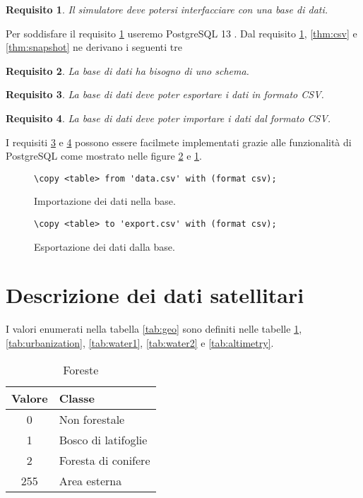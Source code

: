 \documentclass[draft]{article}
\newtheorem{requirement}{Requisito}
\begin{document}
\begin{requirement}\label{thm:db}
Il simulatore deve potersi interfacciare con una base di dati.
\end{requirement}

Per soddisfare il requisito \ref{thm:db} useremo PostgreSQL 13 \cite{psql}. Dal
requisito \ref{thm:db}, \ref{thm:csv} e \ref{thm:snapshot} ne derivano i
seguenti tre

\begin{requirement}
La base di dati ha bisogno di uno schema.
\end{requirement}

\begin{requirement}\label{thm:export}
La base di dati deve poter esportare i dati in formato CSV.
\end{requirement}

\begin{requirement}\label{thm:import}
La base di dati deve poter importare i dati dal formato CSV.
\end{requirement}

I requisiti \ref{thm:export} e \ref{thm:import} possono essere facilmete
implementati grazie alle funzionalità di PostgreSQL come mostrato nelle figure
\ref{fig:export} e \ref{fig:import}.

\begin{figure}
\centering\verb+\copy <table> from 'data.csv' with (format csv);+
\caption{Importazione dei dati nella base.}
\label{fig:import}
\end{figure}

\begin{figure}
\centering\verb+\copy <table> to 'export.csv' with (format csv);+
\caption{Esportazione dei dati dalla base.}
\label{fig:export}
\end{figure}

\appendix

\section{Descrizione dei dati satellitari}\label{sec:desc}

I valori enumerati nella tabella \ref{tab:geo} sono definiti nelle tabelle
\ref{tab:forest}, \ref{tab:urbanization}, \ref{tab:water1}, \ref{tab:water2} e
\ref{tab:altimetry}.

\begin{table}
\centering
\begin{tabular}{|c|l|}
\hline
\textbf{Valore} & \textbf{Classe}\\
\hline
0 & Non forestale\\
1 & Bosco di latifoglie\\
2 & Foresta di conifere\\
255 & Area esterna\\
\hline
\end{tabular}
\caption{Foreste}
\label{tab:forest}
\end{table}
\end{document}
